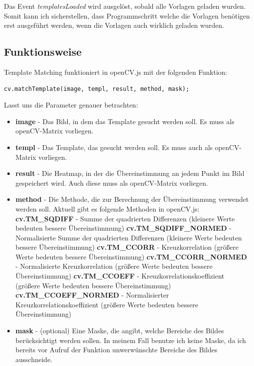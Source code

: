 Das Event \textit{templatesLoaded} wird ausgelöst, sobald alle Vorlagen geladen wurden. Somit kann ich sicherstellen, dass Programmschritt welche die Vorlagen benötigen erst ausgeführt werden, wenn die Vorlagen auch wirklich geladen wurden.
\subsection{Funktionsweise}
Template Matching funktioniert in openCV.js mit der folgenden Funktion:
\begin{lstlisting}[style=JavaScript]
cv.matchTemplate(image, templ, result, method, mask);
\end{lstlisting}

Lasst uns die Parameter genauer betrachten:
\begin{itemize}
    \item \textbf{image} - Das Bild, in dem das Template gesucht werden soll. Es muss als openCV-Matrix vorliegen.
    \item \textbf{templ} - Das Template, das gesucht werden soll. Es muss auch als openCV-Matrix vorliegen.
    \item \textbf{result} - Die Heatmap, in der die Übereinstimmung an jedem Punkt im Bild gespeichert wird. Auch diese muss als openCV-Matrix vorliegen.
    \item \textbf{method} - Die Methode, die zur Berechnung der Übereinstimmung verwendet werden soll. Aktuell gibt es folgende Methoden in openCV.js:
    \subitem \textbf{cv.TM\_SQDIFF} - Summe der quadrierten Differenzen (kleinere Werte bedeuten bessere Übereinstimmung)
    \subitem \textbf{cv.TM\_SQDIFF\_NORMED} - Normalisierte Summe der quadrierten Differenzen (kleinere Werte bedeuten bessere Übereinstimmung)
    \subitem \textbf{cv.TM\_CCORR} - Kreuzkorrelation (größere Werte bedeuten bessere Übereinstimmung)
    \subitem \textbf{cv.TM\_CCORR\_NORMED} - Normalisierte Kreuzkorrelation (größere Werte bedeuten bessere Übereinstimmung)
    \subitem \textbf{cv.TM\_CCOEFF} - Kreuzkorrelationskoeffizient (größere Werte bedeuten bessere Übereinstimmung)
    \subitem \textbf{cv.TM\_CCOEFF\_NORMED} - Normalisierter Kreuzkorrelationskoeffizient (größere Werte bedeuten bessere Übereinstimmung)
    \item \textbf{mask} - (optional) Eine Maske, die angibt, welche Bereiche des Bildes berücksichtigt werden sollen. In meinem Fall benutze ich keine Maske, da ich bereits vor Aufruf der Funktion unwerwünschte Bereiche des Bildes ausschneide.
\end{itemize}

